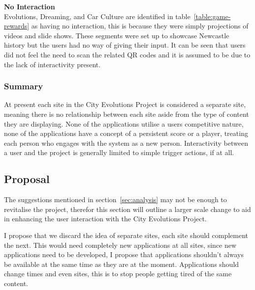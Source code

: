 \documentclass[a4paper,12pt]{article}
\begin{document}
\par
\textbf{No Interaction}\\
Evolutions, Dreaming, and Car Culture are identified in table~\ref{table:game-rewards} as having no interaction, this is because they were simply projections of videos and slide shows. 
These segments were set up to showcase Newcastle history but the users had no way of giving their input. 
It can be seen that users did not feel the need to scan the related QR codes and it is assumed to be due to the lack of interactivity present.

\subsubsection{Summary}
At present each site in the City Evolutions Project is considered a separate site, meaning there is no relationship between each site aside from the type of content they are displaying.
None of the applications utilise a users competitive nature, none of the applications have a concept of a persistent score or a player, treating each person who engages with the system as a new person.
Interactivity between a user and the project is generally limited to simple trigger actions, if at all.

\subsection{Proposal}
The suggestions mentioned in section~\ref{sec:analysis} may not be enough to revitalise the project, therefor this section will outline a larger scale change to aid in enhancing the user interaction with the City Evolutions Project.

I propose that we discard the idea of separate sites, each site should complement the next. 
This would need completely new applications at all sites, since new applications need to be developed, I propose that applications shouldn't always be available at the same time as they are at the moment.
Applications should change times and even sites, this is to stop people getting tired of the same content.
\end{document}
